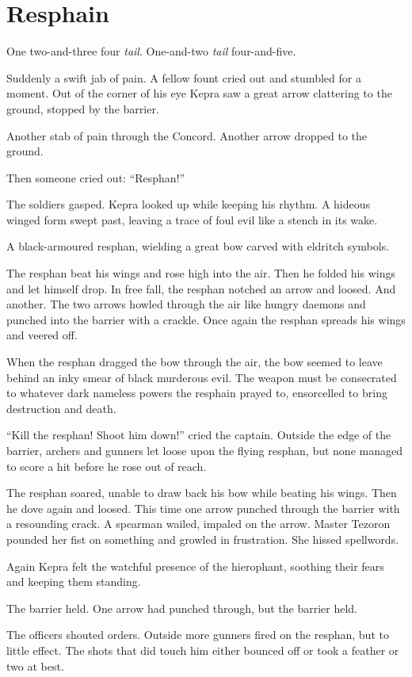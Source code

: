 \documentclass
  [a4paper,
   12pt,
   oneside
  ]%
  {article}
\newcommand{\drum}[1]{\textsf{#1}}
\begin{document}
\section{Resphain}
\drum{One two-and-three four \emph{tail}. One-and-two \emph{tail} four-and-five.}\nopagebreak

Suddenly a swift jab of pain. A fellow fount cried out and stumbled for a moment. Out of the corner of his eye Kepra saw a great arrow clattering to the ground, stopped by the barrier.

Another stab of pain through the Concord. 
Another arrow dropped to the ground.

Then someone cried out: ``Resphan!''

The soldiers gasped. Kepra looked up while keeping his rhythm. A hideous winged form swept past, leaving a trace of foul evil like a stench in its wake. 

A black-armoured resphan, wielding a great bow carved with eldritch symbols. 

The resphan beat his wings and rose high into the air. Then he folded his wings and let himself drop. In free fall, the resphan notched an arrow and loosed. And another. The two arrows howled through the air like hungry daemons and punched into the barrier with a crackle. Once again the resphan spreads his wings and veered off.

When the resphan dragged the bow through the air, the bow seemed to leave behind an inky smear of black murderous evil. 
The weapon must be consecrated to whatever dark nameless powers the resphain prayed to, ensorcelled to bring destruction and death.

``Kill the resphan! Shoot him down!'' cried the captain. Outside the edge of the barrier, archers and gunners let loose upon the flying resphan, but none managed to score a hit before he rose out of reach. 

The resphan soared, unable to draw back his bow while beating his wings. 
Then he dove again and loosed. This time one arrow punched through the barrier with a resounding crack. 
A spearman wailed, impaled on the arrow. Master Tezoron pounded her fist on something and growled in frustration. She hissed spellwords. 

Again Kepra felt the watchful presence of the hierophant, soothing their fears and keeping them standing.

The barrier held. One arrow had punched through, but the barrier held. 

The officers shouted orders. Outside more gunners fired on the resphan, but to little effect. The shots that did touch him either bounced off or took a feather or two at best.
\end{document}
